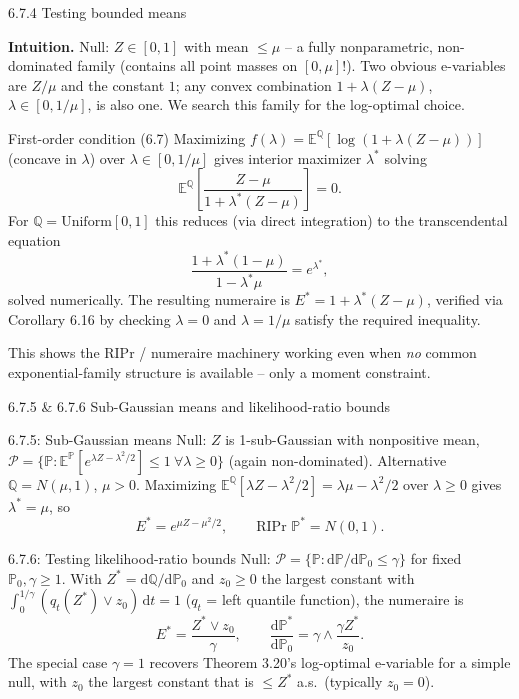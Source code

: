 \documentclass[aspectratio=169,10pt]{beamer}
\newcommand{\bE}{\mathbb{E}}
\newcommand{\bP}{\mathbb{P}}
\newcommand{\bQ}{\mathbb{Q}}
\newcommand{\cP}{\mathcal{P}}
\begin{document}
\begin{frame}[allowframebreaks]{6.7.4 Testing bounded means}

\textbf{Intuition.} Null: $Z \in [0,1]$ with mean $\le \mu$ -- a fully
nonparametric, non-dominated family (contains all point masses on
$[0,\mu]$!). Two obvious e-variables are $Z/\mu$ and the constant $1$;
any convex combination $1+\lambda(Z-\mu)$, $\lambda \in [0,1/\mu]$, is
also one. We search this family for the log-optimal choice.

\begin{block}{First-order condition (6.7)}
Maximizing $f(\lambda) = \bE^{\bQ}[\log(1+\lambda(Z-\mu))]$ (concave in
$\lambda$) over $\lambda \in [0,1/\mu]$ gives interior maximizer
$\lambda^*$ solving
\[
\bE^{\bQ}\!\left[\frac{Z-\mu}{1+\lambda^*(Z-\mu)}\right] = 0.
\]
For $\bQ = \mathrm{Uniform}[0,1]$ this reduces (via direct integration)
to the transcendental equation
\[
\frac{1+\lambda^*(1-\mu)}{1-\lambda^*\mu} = e^{\lambda^*},
\]
solved numerically. The resulting numeraire is
$E^* = 1+\lambda^*(Z-\mu)$, verified via Corollary 6.16 by checking
$\lambda=0$ and $\lambda=1/\mu$ satisfy the required inequality.
\end{block}
This shows the RIPr / numeraire machinery working even when \emph{no}
common exponential-family structure is available -- only a moment
constraint.
\end{frame}

\begin{frame}{6.7.5 \& 6.7.6 Sub-Gaussian means and likelihood-ratio bounds}

\begin{block}{6.7.5: Sub-Gaussian means}
Null: $Z$ is 1-sub-Gaussian with nonpositive mean,
$\cP = \{\bP : \bE^{\bP}[e^{\lambda Z - \lambda^2/2}] \le 1\ \forall \lambda\ge0\}$
(again non-dominated). Alternative $\bQ = N(\mu,1)$, $\mu>0$. Maximizing
$\bE^{\bQ}[\lambda Z-\lambda^2/2] = \lambda\mu-\lambda^2/2$ over
$\lambda\ge0$ gives $\lambda^*=\mu$, so
\[
E^* = e^{\mu Z - \mu^2/2}, \qquad \text{RIPr } \bP^* = N(0,1).
\]
\end{block}

\begin{block}{6.7.6: Testing likelihood-ratio bounds}
Null: $\cP=\{\bP: \mathrm{d}\bP/\mathrm{d}\bP_0 \le \gamma\}$ for fixed
$\bP_0,\gamma\ge1$. With $Z^*=\mathrm{d}\bQ/\mathrm{d}\bP_0$ and $z_0\ge0$
the largest constant with $\int_0^{1/\gamma}(q_t(Z^*)\vee z_0)\,\mathrm{d}t=1$
($q_t$ = left quantile function), the numeraire is
\[
E^* = \frac{Z^* \vee z_0}{\gamma}, \qquad
\frac{\mathrm{d}\bP^*}{\mathrm{d}\bP_0} = \gamma \wedge \frac{\gamma Z^*}{z_0}.
\]
The special case $\gamma=1$ recovers Theorem 3.20's log-optimal
e-variable for a simple null, with $z_0$ the largest constant that is
$\le Z^*$ a.s.\ (typically $z_0=0$).
\end{block}
\end{frame}
\end{document}
